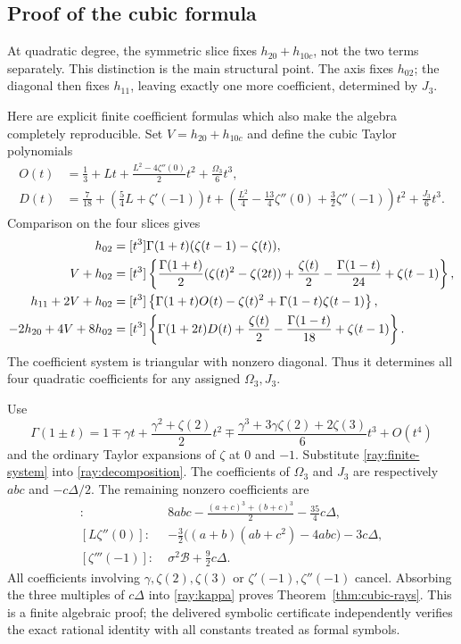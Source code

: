 \subsection{Proof of the cubic formula}

At quadratic degree, the symmetric slice fixes
$h_{20}+h_{10c}$, not the two terms separately. This distinction is
the main structural point. The axis fixes $h_{02}$; the diagonal
then fixes $h_{11}$, leaving exactly one more coefficient, determined
by $J_3$.

Here are explicit finite coefficient formulas which also make the
algebra completely reproducible. Set $V=h_{20}+h_{10c}$ and define
the cubic Taylor polynomials
\begin{align*}
 O(t)&=\frac13+Lt+\frac{L^2-4\zeta''(0)}2t^2
                         +\frac{\Omega_3}{6}t^3,\\
 D(t)&=\frac7{18}+\left(\frac54L+\zeta'(-1)\right)t
       +\left(\frac{L^2}{4}-\frac{13}{4}\zeta''(0)
                               +\frac32\zeta''(-1)\right)t^2
       +\frac{J_3}{6}t^3.
\end{align*}
Comparison on the four slices gives
\begin{align}
 h_{02}&=[t^3]\Gamma(1+t)(\zeta(t-1)-\zeta(t)),\notag\\
 V+h_{02}&=[t^3]\left\{
 \frac{\Gamma(1+t)}2(\zeta(t)^2-\zeta(2t))
 +\frac{\zeta(t)}2-\frac{\Gamma(1-t)}{24}+\zeta(t-1)\right\},\notag\\
 h_{11}+2V+h_{02}&=[t^3]\left\{
 \Gamma(1+t)O(t)-\zeta(t)^2+\Gamma(1-t)\zeta(t-1)\right\},\notag\\
 -2h_{20}+4V+8h_{02}&=[t^3]\left\{
 \Gamma(1+2t)D(t)+\frac{\zeta(t)}2
                      -\frac{\Gamma(1-t)}{18}+\zeta(t-1)\right\}.
 \label{ray:finite-system}
\end{align}
The coefficient system is triangular with nonzero diagonal. Thus
it determines all four quadratic coefficients for any assigned
$\Omega_3,J_3$.

Use
\[
 \Gamma(1\pm t)=1\mp\gamma t+
 \frac{\gamma^2+\zeta(2)}2t^2
 \mp\frac{\gamma^3+3\gamma\zeta(2)+2\zeta(3)}6t^3+O(t^4)
\]
and the ordinary Taylor expansions of $\zeta$ at $0$ and $-1$.
Substitute \eqref{ray:finite-system} into
\eqref{ray:decomposition}. The coefficients of $\Omega_3$ and
$J_3$ are respectively $abc$ and $-c\Delta/2$.
The remaining nonzero coefficients are
\begin{align*}
 [\zeta'''(0)]\colon\;&8abc-\frac{(a+c)^3+(b+c)^3}{2}
                                      -\frac{35}{4}c\Delta,\\
 [L\zeta''(0)]\colon\;&-\frac32\bigl((a+b)(ab+c^2)-4abc\bigr)
                                      -3c\Delta,\\
 [\zeta'''(-1)]\colon\;&\sigma^2\mathcal B+\frac92c\Delta.
\end{align*}
All coefficients involving $\gamma,\zeta(2),\zeta(3)$ or
$\zeta'(-1),\zeta''(-1)$ cancel. Absorbing the three multiples
of $c\Delta$ into \eqref{ray:kappa} proves
Theorem~\ref{thm:cubic-rays}. This is a finite algebraic proof;
the delivered symbolic certificate independently verifies the exact
rational identity with all constants treated as formal symbols.

